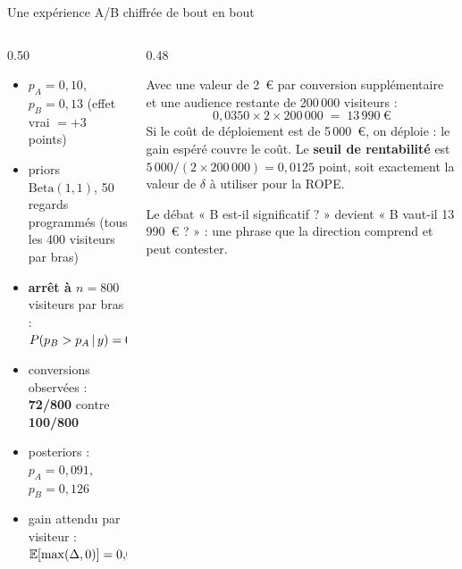 \begin{frame}{Une expérience A/B chiffrée de bout en bout}
\begin{columns}[t]
\begin{column}{0.50\textwidth}
\begin{ebox}
\begin{itemize}
  \item $p_A = 0{,}10$, $p_B = 0{,}13$ (effet vrai $= +3$ points)
  \item priors $\mathrm{Beta}(1,1)$, 50 regards programmés
        (tous les 400 visiteurs par bras)
  \item \textbf{arrêt à $n = 800$} visiteurs par bras :
        $P(p_B > p_A \,\vert\, y) = 0{,}99$
  \item conversions observées : \textbf{72/800} contre \textbf{100/800}
  \item posteriors : $p_A = 0{,}091$, $p_B = 0{,}126$
  \item gain attendu par visiteur : $\mathbb{E}[\max(\Delta,0)] = 0{,}0350$
\end{itemize}
\end{ebox}
\end{column}
\begin{column}{0.48\textwidth}
\begin{solbox}
Avec une valeur de 2~€ par conversion supplémentaire et une audience
restante de 200\,000 visiteurs :
\[
0{,}0350 \times 2 \times 200\,000 \;=\; 13\,990~\text{€}
\]
Si le coût de déploiement est de 5\,000~€, on déploie : le gain espéré
couvre le coût. Le \textbf{seuil de rentabilité} est
$5\,000/(2\times200\,000) = 0{,}0125$ point, soit exactement la valeur de
$\delta$ à utiliser pour la ROPE.
\end{solbox}
\begin{kbox}
Le débat « B est-il significatif ? » devient « B vaut-il 13\,990~€ ? » :
une phrase que la direction comprend et peut contester.
\end{kbox}
\end{column}
\end{columns}
\end{frame}

